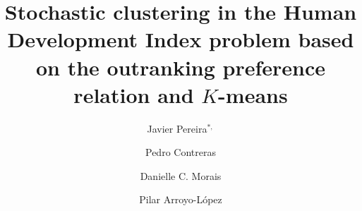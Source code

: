 \documentclass[]{elsarticle}
\theoremstyle{definition}
\begin{document}
\begin{frontmatter}                           %


\title{Stochastic clustering in the Human Development Index problem based on the outranking preference relation and $K$-means}



%

\author[utc]{Javier Pereira$^{*,}$\cortext[cor1]}
\author[ap]{Pedro Contreras}
\author[ufpe]{Danielle C. Morais}
\author[itesm]{Pilar Arroyo-L\'opez}




\address[utc]{Universidad Tecnol\'ogica de Chile Inacap, Santiago, Chile (xjavierpereira7@gmail.com); \\}
\address[ap]{Berlin, Germany (pedro.contreras@gmail.com);}
\address[ufpe]{Universidade Federal de Pernambuco, CDSID (dcmorais@cdsid.org.br);}
\address[itesm]{Tecnologico de Monterrey, Campus Toluca, M\'exico (pilar.arroyo@itesm.mx);}




\end{frontmatter}
\end{document}
